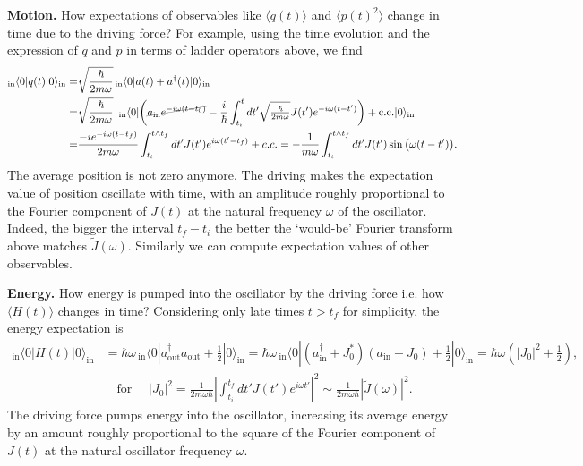 \documentclass[../QFT_main.tex]{subfiles}
\begin{document}
\begin{mytheorem}
\noindent
\noindent
\textbf{Motion.} How expectations of observables like $\langle q(t)\rangle$ and $\langle p(t)^2\rangle$ change in time due to the driving force?
For example, using the time evolution and the expression of $q$ and $p$ in terms of ladder operators above, we find
\begin{align}
    {}_{\mathrm{in}}\langle 0 | q(t) | 0 \rangle_{\mathrm{in}} =& \sqrt{\frac{\hbar}{2 m \omega}} \,{}_{\mathrm{in}}\langle 0 | a(t) + a^\dagger(t) | 0 \rangle_{\mathrm{in}}
    \\
    = &\sqrt{\frac{\hbar}{2 m \omega}}\,\,\, {}_{\mathrm{in}}\langle 0 | \bigg(\graycancel{a_{\mathrm{in}} e^{-i\omega (t-t_0)} }  - \frac{i}{\hbar} \int_{t_i}^t dt' \sqrt{\tfrac{\hbar}{2 m \omega}} J(t') e^{-i\omega (t-t')}\bigg) + \text{c.c.} | 0 \rangle_{\mathrm{in}}
    \\
    = &\frac{-ie^{-i\omega (t-t_f)}}{2m \omega}\int_{t_i}^{t\wedge t_f} dt' J(t') e^{i\omega (t'-t_f)}+ c.c.
    = -\frac{1}{m \omega} \int_{t_i}^{t\wedge t_f} dt' J(t') \sin\big(\omega (t - t')\big).
\end{align}
The average position is not zero anymore. 
The driving makes the expectation value of position oscillate with time, with an amplitude roughly proportional to the Fourier component of $J(t)$ at the natural frequency $\omega$ of the oscillator.
Indeed, the bigger the interval $t_f-t_i$ the better the `would-be' Fourier transform above matches $\tilde{J}(\omega)$.
Similarly we can compute expectation values of other observables.
\smallskip

\noindent
\textbf{Energy.} How energy is pumped into the oscillator by the driving force i.e. how {\small $\langle H(t)\rangle$} changes in time?
Considering only late times $t>t_f$ for simplicity, the energy expectation is
\begin{align}
    {}_{\mathrm{in}}\langle 0 | H(t) | 0 \rangle_{\mathrm{in}} &= \hbar \omega \,{}_{\mathrm{in}}\langle 0 | a_{\mathrm{out}}^\dagger a_{\mathrm{out}} + \tfrac{1}{2} | 0 \rangle_{\mathrm{in}}
    = \hbar \omega \,{}_{\mathrm{in}}\langle 0 | (a_{\mathrm{in}}^\dagger + J_0^*)(a_{\mathrm{in}} + J_0) + \tfrac{1}{2} | 0 \rangle_{\mathrm{in}}
    = \hbar \omega \left(|J_0|^2 + \tfrac{1}{2}\right),
    \\[6pt]
    &\quad\text{for }\quad |J_0|^2 = \frac{1}{2 m \omega \hbar} \left|\int_{t_i}^{t_f} dt' J(t') e^{i\omega t'}\right|^2 \sim \frac{1}{2 m \omega \hbar} |\tilde{J}(\omega)|^2.
\end{align}
The driving force pumps energy into the oscillator, increasing its average energy by an amount roughly proportional to the square of the Fourier component of $J(t)$ at the natural oscillator frequency $\omega$.
\smallskip


\end{mytheorem}
\end{document}
